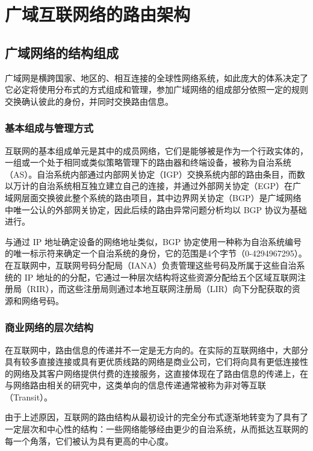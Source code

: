 
\section{广域互联网络的路由架构}

\subsection{广域网络的结构组成}

广域网是横跨国家、地区的、相互连接的全球性网络系统，如此庞大的体系决定了它必定将使用分布式的方式组成和管理，参加广域网络的组成部分依照一定的规则交换确认彼此的身份，并同时交换路由信息。

\subsubsection{基本组成与管理方式}

互联网的基本组成单元是其中的成员网络，它们是能够被是作为一个行政实体的，一组或一个处于相同或类似策略管理下的路由器和终端设备，被称为自治系统（AS）。自治系统内部通过内部网关协定（IGP）交换系统内部的路由条目，而数以万计的自治系统相互独立建立自己的连接，并通过外部网关协定（EGP）在广域网层面交换彼此整个系统的路由项目，其中边界网关协定（BGP）是广域网络中唯一公认的外部网关协定，因此后续的路由异常问题分析均以 BGP 协议为基础进行。

与通过 IP 地址确定设备的网络地址类似，BGP 协定使用一种称为自治系统编号的唯一标示符来确定一个自治系统的身份，它的范围是4个字节（0-4294967295）。在互联网中，互联网号码分配局（IANA）负责管理这些号码及所属于这些自治系统的 IP 地址的的分配，它通过一种层次结构将这些资源分配给五个区域互联网注册局（RIR），而这些注册局则通过本地互联网注册局（LIR）向下分配获取的资源和网络号码。

\subsubsection{商业网络的层次结构}

在互联网中，路由信息的传递并不一定是无方向的。在实际的互联网络中，大部分具有较多直接连接或具有更优质线路的网络是商业公司，它们将向具有更低连接性的网络及其客户网络提供付费的连接服务，这直接体现在了路由信息的传递上，在与网络路由相关的研究中，这类单向的信息传递通常被称为非对等互联（Transit）。

由于上述原因，互联网的路由结构从最初设计的完全分布式逐渐地转变为了具有了一定层次和中心性的结构：一些网络能够经由更少的自治系统，从而抵达互联网的每一个角落，它们被认为具有更高的中心度。

